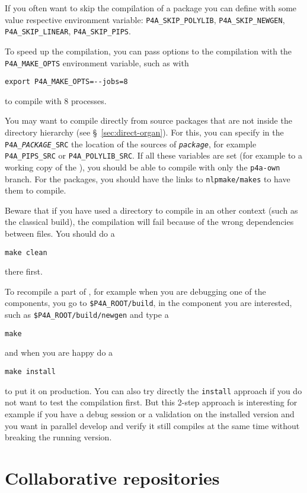 \documentclass[a4paper]{article}
\begin{document}
If you often want to skip the compilation of a package you can define with
some value respective environment variable: \verb|P4A_SKIP_POLYLIB|,
\verb|P4A_SKIP_NEWGEN|, \verb|P4A_SKIP_LINEAR|, \verb|P4A_SKIP_PIPS|.

To speed up the compilation, you can pass options to the compilation with
the \verb|P4A_MAKE_OPTS| environment variable, such as with
\begin{verbatim}
export P4A_MAKE_OPTS=--jobs=8
\end{verbatim}
to compile with 8 processes.

You may want to compile \Apfa directly from source packages that are not
inside the \Apfa directory hierarchy (see \S~\ref{sec:direct-organ}). For
this, you can specify in the \texttt{P4A\_\emph{PACKAGE}\_SRC} the
location of the sources of \texttt{\emph{package}}, for example
\verb|P4A_PIPS_SRC| or \verb|P4A_POLYLIB_SRC|. If all these variables are
set (for example to a working copy of the \Apips{} \Asvn), you should be
able to compile with only the \texttt{p4a-own} branch. For the \Apips
packages, you should have the links to \texttt{nlpmake/makes} to have them
to compile.

Beware that if you have used a \Apips directory to compile in an other
context (such as the classical \Asvn build), the compilation will fail
because of the wrong dependencies between files. You should do a
\begin{verbatim}
make clean
\end{verbatim}
there first.

To recompile a part of \Apfa, for example when you are debugging one of
the components, you go to \verb|$P4A_ROOT/build|, in the component you are
interested, such as \verb|$P4A_ROOT/build/newgen| and type a
\begin{verbatim}
make
\end{verbatim}
and when you are happy do a
\begin{verbatim}
make install
\end{verbatim}
to put it on production. You can also try directly the \texttt{install}
approach if you do not want to test the compilation first. But this 2-step
approach is interesting for example if you have a debug session or a
validation on the installed version and you want in parallel develop and
verify it still compiles at the same time without breaking the running
version.



\section{Collaborative repositories}
\label{sec:coll-repos}
\end{document}

